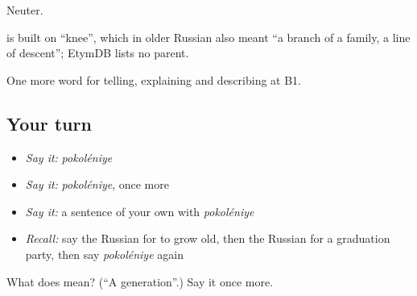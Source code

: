 Neuter.

\begin{cousinweb}
\emph{} is built on \emph{} \textquotedblleft{}knee\textquotedblright{}, which in older Russian also meant \textquotedblleft{}a branch of a family, a line of descent\textquotedblright{}; EtymDB lists no parent.
\end{cousinweb}

\begin{grammarlens}[title={What you've built}]
One more word for telling, explaining and describing at B1.
\end{grammarlens}

\subsection*{Your turn}
\begin{itemize}
\raggedright
  \item \emph{Say it:} \emph{pokoléniye}
  \item \emph{Say it:} \emph{pokoléniye}, once more
  \item \emph{Say it:} a sentence of your own with \emph{pokoléniye}
  \item \emph{Recall:} say the Russian for to grow old, then the Russian for a graduation party, then say \emph{pokoléniye} again
\end{itemize}

\begin{tcolorbox}[breakable,colback=teal!4,colframe=teal!35!black,title={Before you move on}]
What does  mean? (\textquotedblleft{}A generation\textquotedblright{}.) Say it once more.
\end{tcolorbox}
